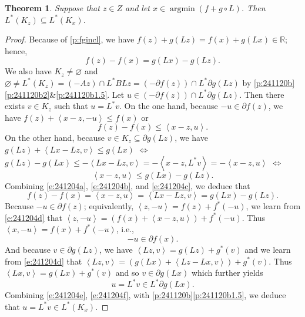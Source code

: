 \documentclass{article}
\providecommand{\siff}{\Leftrightarrow}
\newcommand{\scal}[2]{\left\langle{#1},{#2}  \right\rangle}
\newcommand{\RR}{\ensuremath{\mathbb R}}
\DeclareMathOperator*{\argmin}{argmin}
\newtheorem{theorem}{Theorem}[section]
\begin{document}
\begin{theorem}
\label{t:fg}
Suppose that $z\in Z$ and 
let $x\in \argmin(f+g\circ L)$.
Then $L^*(K_z)\subseteq L^*(K_x)$. 
\end{theorem}
\begin{proof}
Because of \cref{p:fgincl}, we have 
$f(z) + g(Lz) = f(x) + g(Lx) \in\RR$; hence, 
\begin{equation}
\label{e:241204a}
f(z)-f(x)=g(Lx)-g(Lz). 
\end{equation}
We also have $K_z\neq \varnothing$ and 
$\varnothing\neq L^*(K_z)= (-Az)\cap L^*BLz 
=(-\partial f(z))\cap L^*\partial g(Lz)$ by 
\cref{p:241120b}\cref{p:241120b2}\&\cref{p:241120b1.5}. 
Let $u\in (-\partial f(z))\cap L^*\partial g(Lz)$. 
Then there exists $v\in K_z$ such that 
$u = L^*v$. 
On the one hand, because $-u\in\partial f(z)$, we have 
$f(z)+\scal{x-z}{-u}\leq f(x)$ or 
\begin{equation}
\label{e:241204b}
f(z)-f(x)\leq \scal{x-z}{u}. 
\end{equation}
On the other hand, because $v\in K_z \subseteq \partial g(Lz)$, 
we have $g(Lz) + \scal{Lx-Lz}{v}\leq g(Lx)$ 
$\siff$ 
$g(Lz)-g(Lx) \leq -\scal{Lx-Lz}{v}=-\scal{x-z}{L^*v}=-\scal{x-z}{u}$ 
$\siff$ 
\begin{equation}
\label{e:241204c}
\scal{x-z}{u} \leq  g(Lx)-g(Lz). 
\end{equation}
Combining \cref{e:241204a}, \cref{e:241204b}, and \cref{e:241204c}, 
we deduce that 
\begin{equation}
\label{e:241204d}
f(z)-f(x)=\scal{x-z}{u} = \scal{Lx-Lz}{v}=g(Lx)-g(Lz). 
\end{equation}
Because $-u\in\partial f(z)$; equivalently, 
$\scal{z}{-u}= f(z)+f^*(-u)$, 
we learn from \cref{e:241204d} that 
$\scal{z}{-u}= (f(x)+\scal{x-z}{u})+f^*(-u)$. 
Thus $\scal{x}{-u} = f(x)+f^*(-u)$, i.e., 
\begin{equation}
\label{e:241204e}
-u \in \partial f(x). 
\end{equation}
And because $v\in\partial g(Lz)$, 
we have $\scal{Lz}{v} = g(Lz) + g^*(v)$ 
and we learn from \cref{e:241204d} that 
$\scal{Lz}{v} = (g(Lx)+\scal{Lz-Lx}{v}) + g^*(v)$. 
Thus $\scal{Lx}{v}=g(Lx) + g^*(v)$ and so 
$v \in \partial g(Lx)$ which further yields
\begin{equation}
\label{e:241204f}
u = L^*v  \in L^*\partial g(Lx). 
\end{equation}
Combining \cref{e:241204e}, \cref{e:241204f}, 
with \cref{p:241120b}\cref{p:241120b1.5}, 
we deduce that $u = L^*v \in L^*(K_x)$. 
\end{proof}
\end{document}
